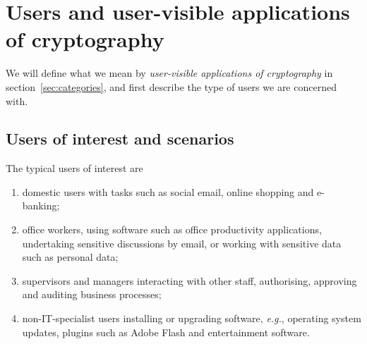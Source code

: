 \documentclass{article}
\newcommand{\eg}{\textit{e.g.}}
\begin{document}
\section{Users and user-visible applications of cryptography}\label{sec:method}

We will define what we mean by \emph{user-visible applications of
  cryptography} in section~\ref{sec:categories},  and first describe the type of users we are
concerned with.  

\subsection{Users of interest and scenarios}\label{sec:users} 

The typical users of interest are
\begin{enumerate}
\item  domestic users with tasks such as social email, online shopping and
  e-banking;
\item  office workers, using software such as office productivity
  applications, undertaking sensitive discussions by email, or working
  with sensitive data such as personal data;
\item supervisors and managers interacting with other staff,
  authorising, approving and auditing business processes;
\item non-IT-specialist users installing or upgrading software, \eg,
  operating system updates, plugins such as Adobe Flash and entertainment software.
\end{enumerate}
\end{document}

